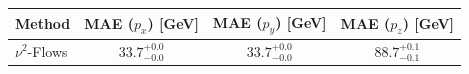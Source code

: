     \begin{tabular}{lccc}
        \toprule
        Method & MAE ($p_x$) [GeV] & MAE ($p_y$) [GeV] & MAE ($p_z$) [GeV] \\
        \midrule
        $\nu^2$-Flows & $33.7_{-0.0}^{+0.0}$ & $33.7_{-0.0}^{+0.0}$ & $88.7_{-0.1}^{+0.1}$ \\
        \bottomrule
    \end{tabular}